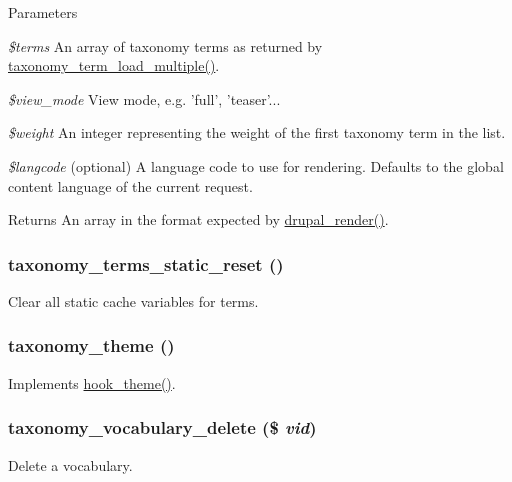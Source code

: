 \begin{DoxyParams}{Parameters}
\item[{\em \$terms}]An array of taxonomy terms as returned by \hyperlink{taxonomy_8module_add67d5d48fc273cf997a650cfb376cda}{taxonomy\_\-term\_\-load\_\-multiple()}. \item[{\em \$view\_\-mode}]View mode, e.g. 'full', 'teaser'... \item[{\em \$weight}]An integer representing the weight of the first taxonomy term in the list. \item[{\em \$langcode}](optional) A language code to use for rendering. Defaults to the global content language of the current request.\end{DoxyParams}
\begin{DoxyReturn}{Returns}
An array in the format expected by \hyperlink{common_8inc_a05798b44e8d6c496d4bee5cc32fa7851}{drupal\_\-render()}. 
\end{DoxyReturn}
\hypertarget{taxonomy_8module_ae8bfe5c889200d0c3fed7b80d8f9d0f4}{
\subsubsection[{taxonomy\_\-terms\_\-static\_\-reset}]{\setlength{\rightskip}{0pt plus 5cm}taxonomy\_\-terms\_\-static\_\-reset ()}}
\label{taxonomy_8module_ae8bfe5c889200d0c3fed7b80d8f9d0f4}
Clear all static cache variables for terms. \hypertarget{taxonomy_8module_a42c8d5509dd32ca172d284e95f1cf125}{
\subsubsection[{taxonomy\_\-theme}]{\setlength{\rightskip}{0pt plus 5cm}taxonomy\_\-theme ()}}
\label{taxonomy_8module_a42c8d5509dd32ca172d284e95f1cf125}
Implements \hyperlink{group__hooks_ga013ccb45c7aaab1c16cf9691428c910d}{hook\_\-theme()}. \hypertarget{taxonomy_8module_aaf15f15db5f29c1068e2e82528292543}{
\subsubsection[{taxonomy\_\-vocabulary\_\-delete}]{\setlength{\rightskip}{0pt plus 5cm}taxonomy\_\-vocabulary\_\-delete (\$ {\em vid})}}
\label{taxonomy_8module_aaf15f15db5f29c1068e2e82528292543}
Delete a vocabulary.


